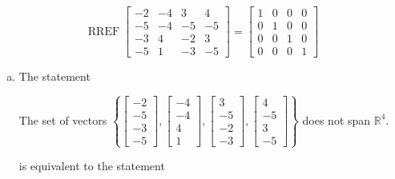 \begin{exerciseAnswer} 


\[\operatorname{RREF} \left[\begin{array}{cccc}
-2 & -4 & 3 & 4 \\
-5 & -4 & -5 & -5 \\
-3 & 4 & -2 & 3 \\
-5 & 1 & -3 & -5
\end{array}\right] = \left[\begin{array}{cccc}
1 & 0 & 0 & 0 \\
0 & 1 & 0 & 0 \\
0 & 0 & 1 & 0 \\
0 & 0 & 0 & 1
\end{array}\right] \]


\begin{enumerate}[(a)]
\item The statement 
\begin{center}\begin{minipage}{0.8\textwidth}
 The set of vectors \( \left\{ \left[\begin{array}{c}
-2 \\
-5 \\
-3 \\
-5
\end{array}\right] , \left[\begin{array}{c}
-4 \\
-4 \\
4 \\
1
\end{array}\right] , \left[\begin{array}{c}
3 \\
-5 \\
-2 \\
-3
\end{array}\right] , \left[\begin{array}{c}
4 \\
-5 \\
3 \\
-5
\end{array}\right] \right\} \) does not span \(\mathbb{R}^4\). 
\end{minipage}\end{center}
     is equivalent to the statement 
\begin{center}\begin{minipage}{0.8\textwidth}
 The vector equation \( x_{1} \left[\begin{array}{c}
-2 \\
-5 \\

\end{array}
\end{minipage}
\end{center}
\end{enumerate}
\end{exerciseAnswer}

